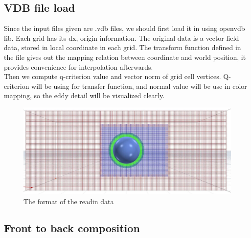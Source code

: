 \documentclass[acmtog]{acmart}
\begin{document}
\subsection{VDB file load}


Since the input files given are .vdb files, we should first load it in using openvdb lib. Each grid has its dx, origin information. The original data is a vector field data, stored in local coordinate in each grid. The transform function defined in the file gives out the mapping relation between coordinate and world position, it provides convenience for interpolation afterwards.\\
Then we compute q-criterion value and vector norm of grid cell vertices. Q-criterion will be using for transfer function, and normal value will be use in color mapping, so the eddy detail will be visualized clearly.


\begin{figure}[h]
	\centering	
	\includegraphics[width=0.7\linewidth]
	{images/data.jpg}
	\caption{The format of the readin data}
\end{figure}


\subsection{Front to back composition}
\end{document}
